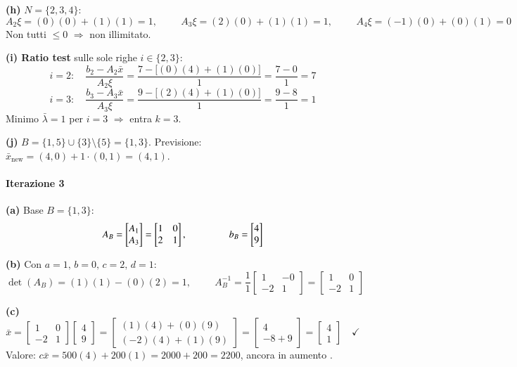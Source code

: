 \documentclass[12pt]{extarticle} %
\begin{document}
\textbf{(h)} $N = \{2,3,4\}$:
\[
A_2\xi = (0)(0) + (1)(1) = 1, \hspace{1cm}
A_3\xi = (2)(0) + (1)(1) = 1, \hspace{1cm}
A_4\xi = (-1)(0) + (0)(1) = 0
\]
Non tutti $\le 0$ $\Rightarrow$ non illimitato.

\textbf{(i) Ratio test} sulle sole righe $i \in \{2,3\}$:
\[
i = 2: \quad \frac{b_2 - A_2\bar{x}}{A_2\xi} = \frac{7 - \big[(0)(4)+(1)(0)\big]}{1} = \frac{7 - 0}{1} = 7
\]
\[
i = 3: \quad \frac{b_3 - A_3\bar{x}}{A_3\xi} = \frac{9 - \big[(2)(4)+(1)(0)\big]}{1} = \frac{9 - 8}{1} = 1
\]
Minimo $\bar{\lambda} = 1$ per $i = 3$ $\Rightarrow$ entra $k = 3$.

\textbf{(j)} $B = \{1,5\} \cup \{3\} \setminus \{5\} = \{1,3\}$. Previsione: $\bar{x}_{\text{new}} = (4,0) + 1\cdot(0,1) = (4,1)$.

\bigskip
\paragraph{Iterazione 3}

\textbf{(a)} Base $B = \{1,3\}$:
\[
A_B = \begin{bmatrix} A_1 \\ A_3\end{bmatrix} = \begin{bmatrix} 1 & 0\\ 2 & 1\end{bmatrix},
\hspace{1.5cm}
b_B = \begin{bmatrix} 4\\ 9\end{bmatrix}
\]

\textbf{(b)} Con $a=1,\,b=0,\,c=2,\,d=1$:
\[
\det(A_B) = (1)(1) - (0)(2) = 1, \hspace{1cm}
A_B^{-1} = \frac{1}{1}\begin{bmatrix} 1 & -0\\ -2 & 1\end{bmatrix} = \begin{bmatrix} 1 & 0\\ -2 & 1\end{bmatrix}
\]

\textbf{(c)}
\[
\bar{x} = \begin{bmatrix} 1 & 0\\ -2 & 1\end{bmatrix}\begin{bmatrix} 4\\ 9\end{bmatrix}
= \begin{bmatrix} (1)(4) + (0)(9)\\ (-2)(4) + (1)(9)\end{bmatrix}
= \begin{bmatrix} 4\\ -8+9\end{bmatrix}
= \begin{bmatrix} 4\\ 1\end{bmatrix} \quad\checkmark
\]
Valore: $c\bar{x} = 500(4) + 200(1) = 2000 + 200 = 2200$, ancora in aumento \checkmark.
\end{document}
